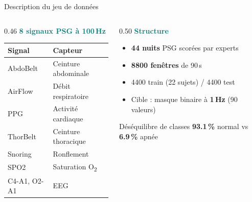 \documentclass[aspectratio=169, 10pt]{beamer}
\begin{document}
\begin{frame}{Description du jeu de données}
    \begin{columns}[T]
        \begin{column}{0.46\textwidth}
            \small\textbf{\textcolor{Teal}{8 signaux PSG à 100\,Hz}}
            \vspace{0.15cm}

            \small
            \begin{tabular}{@{}ll@{}}
                \toprule
                \textbf{Signal} & \textbf{Capteur} \\
                \midrule
                AbdoBelt     & Ceinture abdominale \\
                AirFlow      & Débit respiratoire  \\
                PPG          & Activité cardiaque  \\
                ThorBelt     & Ceinture thoracique \\
                Snoring      & Ronflement          \\
                SPO2         & Saturation O\textsubscript{2} \\
                C4-A1, O2-A1 & EEG                 \\
                \bottomrule
            \end{tabular}
        \end{column}
        \begin{column}{0.50\textwidth}
            \small\textbf{\textcolor{Teal}{Structure}}
            \vspace{0.1cm}
            \begin{itemize}\setlength\itemsep{2pt}
                \item \textbf{44 nuits} PSG scorées par experts
                \item \textbf{8800 fenêtres} de 90\,s
                \item 4400 train (22 sujets) / 4400 test
                \item Cible : masque binaire à \textbf{1\,Hz} (90 valeurs)
            \end{itemize}
            \vspace{0.2cm}
            \begin{alertblock}{Déséquilibre de classes}
                \centering\small
                \textbf{93.1\,\%} normal \quad vs \quad \textbf{6.9\,\%} apnée
            \end{alertblock}
        \end{column}
    \end{columns}
\end{frame}
\end{document}
